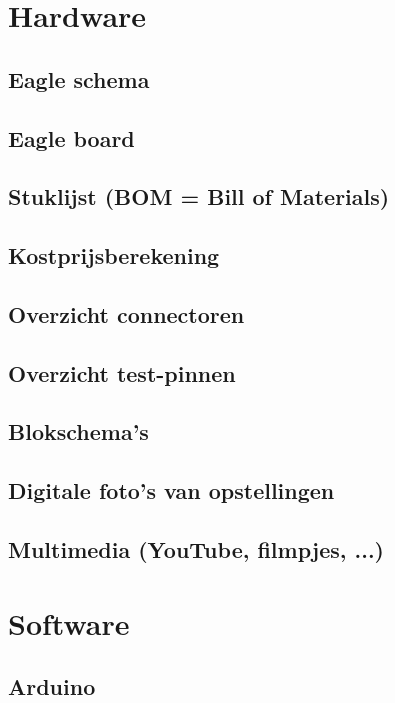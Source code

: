 \documentclass[a4paper]{report}
\begin{document}
\chapter{Hardware}
\section{Eagle schema}

\section{Eagle board}

\section{Stuklijst (BOM = Bill of Materials)}

\section{Kostprijsberekening}

\section{Overzicht connectoren}

\section{Overzicht test-pinnen}

\section{Blokschema’s}

\section{Digitale foto’s van opstellingen}

\section{Multimedia (YouTube, filmpjes, ...)}

\chapter{Software}
\section{Arduino}
\end{document}
